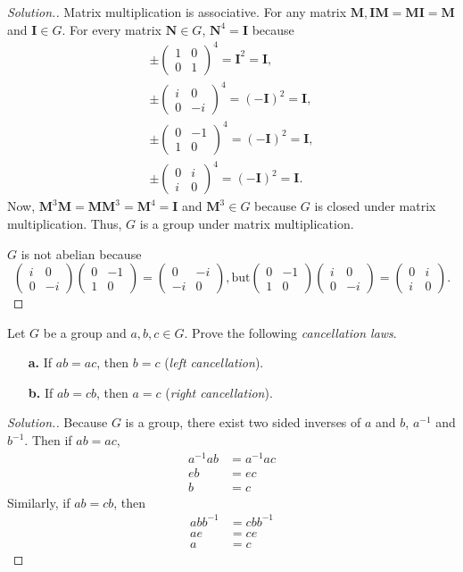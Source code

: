 \documentclass{article}
\newcounter{exercise}
\newenvironment{exercise}{\addtocounter{exercise}{1} \noindent{\bf{Exercise \theexercise.}}}{\vspace{.5cm}}
\newcommand{\mat}[4]{\left( \begin{array}{cc} #1 & #2 \\ #3 & #4  \end{array} \right)}
\begin{document}
\begin{proof}[Solution.]
Matrix multiplication is associative. For any matrix $\textbf{M}, \textbf{I}\textbf{M}=\textbf{M}\textbf{I}=\textbf{M}$ and $\textbf{I}\in G$. For every matrix $\textbf{N}\in G$, $\textbf{N}^4=\textbf{I}$ because
\[
\begin{split}
\pm\mat{1}{0}{0}{1}^4=\textbf{I}^2=\textbf{I}, \\
\pm \mat{i}{0}{0}{-i}^4=(-\textbf{I})^2=\textbf{I}, \\
\pm \mat{0}{-1}{1}{0}^4=(-\textbf{I})^2=\textbf{I} ,\\
\pm \mat{0}{i}{i}{0}^4=(-\textbf{I})^2=\textbf{I}.
\end{split}
\]
Now, $\textbf{M}^3 \textbf{M}=\textbf{M}\textbf{M}^3=\textbf{M}^4=\textbf{I}$ and $\textbf{M}^3\in G$ because $G$ is closed under matrix multiplication. Thus, $G$ is a group under matrix multiplication.

$G$ is not abelian because
\[
\mat{i}{0}{0}{-i} \mat{0}{-1}{1}{0}=\mat{0}{-i}{-i}{0}, \text{but}  \mat{0}{-1}{1}{0}\mat{i}{0}{0}{-i} =\mat{0}{i}{i}{0}.
\]
\end{proof}

\begin{exercise}
Let $G$ be a group and $a,b,c \in G$.  Prove the following {\em cancellation laws}.

\begin{itemize}

\item[\bf a.]  If $ab = ac$, then $b = c$ ({\em left cancellation}).

\item[\bf b.]  If $ab = cb$, then $a = c$ ({\em right cancellation}).

\end{itemize}

\end{exercise}

\begin{proof}[Solution.]
Because $G$ is a group, there exist two sided inverses of $a$ and $b$, $a^{-1}$ and $b^{-1}$. Then if $ab = ac$,
\[
\begin{split}
    a^{-1}ab &=  a^{-1}ac\\
    eb &= ec\\
    b&=c
\end{split}
\]
Similarly, if $ab = cb$, then
\[
\begin{split}
    abb^{-1} &=  cbb^{-1}\\
    ae &= ce\\
    a&=c
\end{split}
\]

\end{proof}
\end{document}
